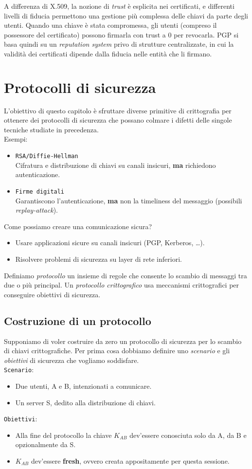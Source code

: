 \documentclass[a4paper, 11pt, twoside, openright, fleqn]{report}
\begin{document}
A differenza di X.509, la nozione di \emph{trust} è esplicita nei certificati, e differenti livelli di fiducia permettono una gestione più complessa delle chiavi da parte degli utenti. Quando una chiave è stata compromessa, gli utenti (compreso il possessore del certificato) possono firmarla con trust a 0 per revocarla. PGP si basa quindi su un \emph{reputation system} privo di strutture centralizzate, in cui la validità dei certificati dipende dalla fiducia nelle entità che li firmano.


\chapter{Protocolli di sicurezza}
L'obiettivo di questo capitolo è sfruttare diverse primitive di crittografia per ottenere dei protocolli di sicurezza che possano colmare i difetti delle singole tecniche studiate in precedenza.\\
Esempi:
\begin{itemize}
	\item \texttt{RSA/Diffie-Hellman}\\
	Cifratura e distribuzione di chiavi su canali insicuri,
	\textbf{ma} richiedono autenticazione.
	\item \texttt{Firme digitali}\\
	Garantiscono l'autenticazione,
	\textbf{ma} non la timeliness del messaggio (possibili \emph{replay-attack}).
\end{itemize}
Come possiamo creare una comunicazione sicura?
\begin{itemize}
	\item Usare applicazioni sicure su canali insicuri (PGP, Kerberos, \dots).
	\item Risolvere problemi di sicurezza su layer di rete inferiori.
\end{itemize}
Definiamo \emph{protocollo} un insieme di regole che consente lo scambio di messaggi tra due o più principal. Un \emph{protocollo crittografico} usa meccanismi crittografici per conseguire obiettivi di sicurezza.

\section{Costruzione di un protocollo}
Supponiamo di voler costruire da zero un protocollo di sicurezza per lo scambio di chiavi crittografiche. Per prima cosa dobbiamo definire uno \emph{scenario} e gli \emph{obiettivi} di sicurezza che vogliamo soddisfare.\\
\texttt{Scenario}:
\begin{itemize}
	\item Due utenti, A e B, intenzionati a comunicare.
	\item Un server S, dedito alla distribuzione di chiavi.
\end{itemize}
\texttt{Obiettivi}:
\begin{itemize}
	\item Alla fine del protocollo la chiave $K_{AB}$ dev'essere conosciuta solo da A, da B e opzionalmente da S.
	\item $K_{AB}$ dev'essere \textbf{fresh}, ovvero creata appositamente per questa sessione.
\end{itemize}
\end{document}
